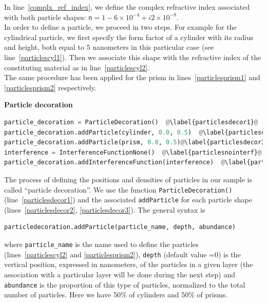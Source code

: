 \noindent In line~\ref{complx_ref_index}, we define the complex refractive index
associated with both particle shapes: \texttt{n}$=1-6\times 10^{-4}+i2\times 10^{-8}$.\\
  
\noindent In order to define a particle, we proceed in two steps. For example for
the cylindrical particle, we first specify the form factor of a cylinder with 
its radius and height, both equal to 5 nanometers in this particular
case (see line~\ref{particlescyl1}). Then we associate this shape with
the refractive index of the constituting material as in line~\ref{particlescyl2}.\\

\noindent The same procedure has been applied for the prism in lines~\ref{particlesprism1} and \ref{particlesprism2} respectively.

\noindent \textbf{Particle decoration} \\

\begin{lstlisting}[language=python, style=eclipseboxed, name=ex1,nolol]
particle_decoration = ParticleDecoration()  @\label{particlesdecor1}@
particle_decoration.addParticle(cylinder, 0.0, 0.5)  @\label{particlesdecor2}@
particle_decoration.addParticle(prism, 0.0, 0.5)@\label{particlesdecor3}@
interference = InterferenceFunctionNone()  @\label{particlesnointerf}@
particle_decoration.addInterferenceFunction(interference)  @\label{particlesinterf}@
\end{lstlisting}

\noindent The process of defining the positions and densities of particles
in our sample is called ``particle decoration''. We use the function \texttt{ParticleDecoration()}
(line~\ref{particlesdecor1}) and  the associated \texttt{addParticle}
for each particle shape (lines~\ref{particlesdecor2}, \ref{particlesdecor3}). The general
syntax is 

\begin{lstlisting}[language=python, style=eclipse,numbers=none]
particledecoration.addParticle(particle_name, depth, abundance) 
\end{lstlisting}

\noindent  where \texttt{particle\_name} is the name used to define the particles
(lines~\ref{particlescyl2} and \ref{particlesprism2}), \texttt{depth}
(default value =0)
is the vertical position, expressed in nanometers, of the particles in a given layer (the
association with a particular layer will be done during the next step) and
\texttt{abundance} is the proportion of this type of particles, 
normalized to the total number of particles. Here we have 50\% of cylinders
and 50\% of prisms. \\ 

